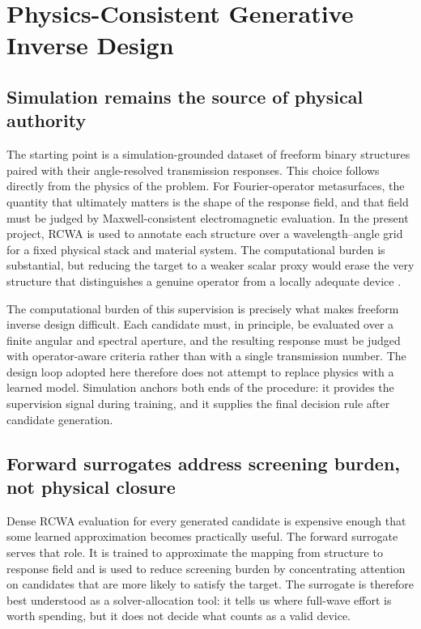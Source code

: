 \section{Physics-Consistent Generative Inverse Design}

\subsection{Simulation remains the source of physical authority}

The starting point is a simulation-grounded dataset of freeform binary structures paired with their angle-resolved transmission responses. This choice follows directly from the physics of the problem. For Fourier-operator metasurfaces, the quantity that ultimately matters is the shape of the response field, and that field must be judged by Maxwell-consistent electromagnetic evaluation. In the present project, RCWA is used to annotate each structure over a wavelength--angle grid for a fixed physical stack and material system. The computational burden is substantial, but reducing the target to a weaker scalar proxy would erase the very structure that distinguishes a genuine operator from a locally adequate device \cite{moharam1981,moharam1995}.

The computational burden of this supervision is precisely what makes freeform inverse design difficult. Each candidate must, in principle, be evaluated over a finite angular and spectral aperture, and the resulting response must be judged with operator-aware criteria rather than with a single transmission number. The design loop adopted here therefore does not attempt to replace physics with a learned model. Simulation anchors both ends of the procedure: it provides the supervision signal during training, and it supplies the final decision rule after candidate generation.

\subsection{Forward surrogates address screening burden, not physical closure}

Dense RCWA evaluation for every generated candidate is expensive enough that some learned approximation becomes practically useful. The forward surrogate serves that role. It is trained to approximate the mapping from structure to response field and is used to reduce screening burden by concentrating attention on candidates that are more likely to satisfy the target. The surrogate is therefore best understood as a solver-allocation tool: it tells us where full-wave effort is worth spending, but it does not decide what counts as a valid device.

